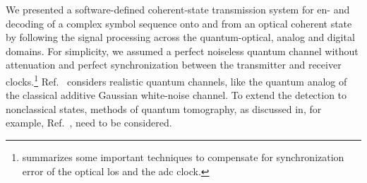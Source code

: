 
We presented a software-defined coherent-state transmission system for en- and decoding of a complex symbol sequence onto and from an optical coherent state by following the signal processing across the quantum-optical, analog and digital domains.
For simplicity, we assumed a perfect noiseless quantum channel without attenuation and perfect synchronization between the transmitter and receiver clocks.\footnote{ summarizes some important techniques to compensate for synchronization error of the optical \glspl{lo} and the \gls{adc} clock.}
Ref.~\cite{Nielsen2010} considers realistic quantum channels, like the quantum analog of the classical additive Gaussian white-noise channel.
To extend the detection to nonclassical states, methods of quantum tomography, as discussed in, for example, Ref.~\cite{Vogel2006}, need to be considered.

